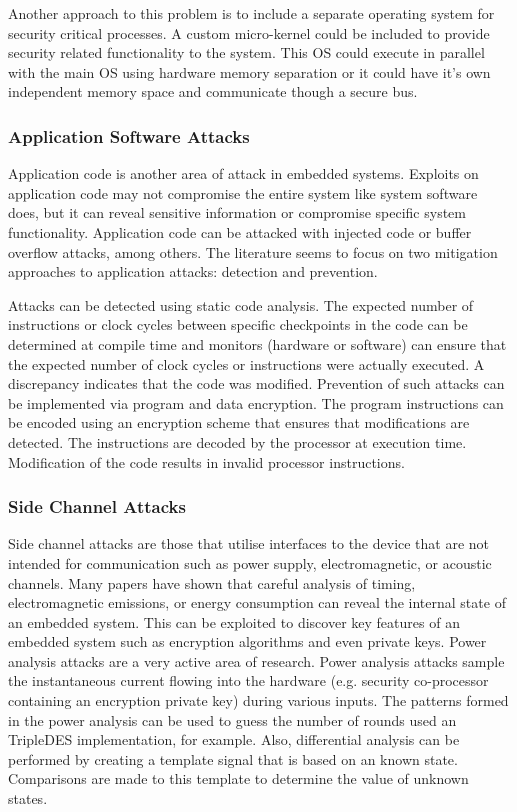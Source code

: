 \documentclass[final,conference,10pt]{IEEEtran}
\begin{document}
Another approach to this problem is to include a separate operating system for security critical processes.  A custom micro-kernel could be included to provide security related functionality to the system.  This OS could execute in parallel with the main OS using hardware memory separation or it could have it's own independent memory space and communicate though a secure bus.\cite{novelOS}

\subsubsection{Application Software Attacks}

Application code is another area of attack in embedded systems.  Exploits on application code may not compromise the entire system like system software does, but it can reveal sensitive information or compromise specific system functionality.  Application code can be attacked with injected code or buffer overflow attacks, among others.  The literature seems to focus on two mitigation approaches to application attacks: detection and prevention.  

Attacks can be detected using static code analysis.  The expected number of instructions or clock cycles between specific checkpoints in the code can be determined at compile time and monitors (hardware or software) can ensure that the expected number of clock cycles or instructions were actually executed.  A discrepancy indicates that the code was modified.  Prevention of such attacks can be implemented via program and data encryption.  The program instructions can be encoded using an encryption scheme that ensures that modifications are detected.  The instructions are decoded by the processor at execution time.  Modification of the code results in invalid processor instructions. \cite{compiler-hardware} \cite{architectural-frameworks}

\subsubsection{Side Channel Attacks}
Side channel attacks are those that utilise interfaces to the device that are not intended for communication such as power supply, electromagnetic, or acoustic channels.  Many papers have shown that careful analysis of timing, electromagnetic emissions, or energy consumption can reveal the internal state of an embedded system. \cite{papers??} This can be exploited to discover key features of an embedded system such as encryption algorithms and even private keys.  Power analysis attacks are a very active area of research.  Power analysis attacks sample the instantaneous current flowing into the hardware (e.g. security co-processor containing an encryption private key) during various inputs.  The patterns formed in the power analysis can be used to guess the number of rounds used an TripleDES implementation, for example.  Also, differential analysis can be performed by creating a template signal that is based on an known state.  Comparisons are made to this template to determine the value of unknown states.  
\end{document}

